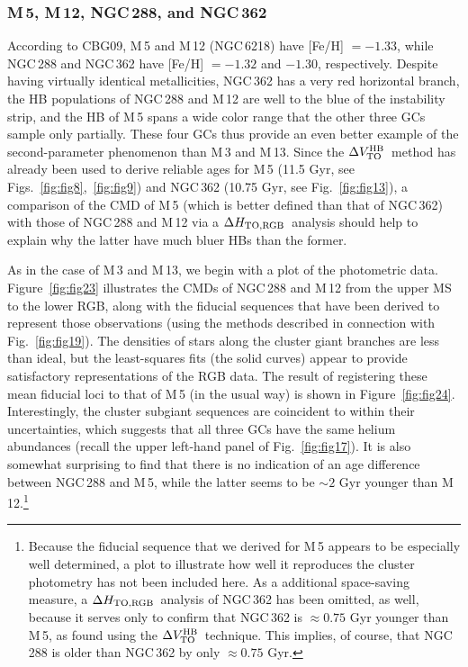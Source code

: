 \documentclass[12pt,preprint]{aastex}
\newcommand\delv{\Delta V^{\rm HB}_{\rm TO}}
\newcommand\delc{\Delta H_{\rm TO,RGB}}
\begin{document}
\subsubsection{M$\,$5, M$\,$12, NGC$\,$288, and NGC$\,$362}
\label{subsec:n288n362}

According to CBG09, M$\,$5 and M$\,$12 (NGC$\,$6218) have [Fe/H] $= -1.33$,
while NGC$\,$288 and NGC$\,$362 have [Fe/H] $= -1.32$ and $-1.30$, respectively.
Despite having virtually identical metallicities, NGC$\,$362 has a very red
horizontal branch, the HB populations of NGC$\,$288 and M$\,$12 are well
to the blue of the instability strip, and the HB of M$\,$5 spans a wide color
range that the other three GCs sample only partially.  These four GCs thus
provide an even better example of the second-parameter phenomenon than M$\,$3
and M$\,$13.  Since the $\delv$\ method has already been used to derive reliable
ages for M$\,$5 (11.5 Gyr, see Figs.~\ref{fig:fig8},~\ref{fig:fig9}) and
NGC$\,$362 (10.75 Gyr, see Fig.~\ref{fig:fig13}), a comparison of the CMD of
M$\,$5 (which is better defined than that of NGC$\,$362) with those of
NGC$\,$288 and M$\,$12 via a $\delc$\ analysis should help to explain why
the latter have much bluer HBs than the former.

As in the case of M$\,$3 and M$\,$13, we begin with a plot of the photometric
data.  Figure~\ref{fig:fig23} illustrates the CMDs of NGC$\,$288 and M$\,$12
from the upper MS to the lower RGB, along with the fiducial sequences that have
been derived to represent those observations (using the methods described in
connection with Fig.~\ref{fig:fig19}).  The densities of stars along the cluster
giant branches are less than ideal, but the least-squares fits (the solid
curves) appear to provide satisfactory representations of the RGB data.  The
result of registering these mean fiducial loci to that of M$\,$5 (in the usual
way) is shown in Figure~\ref{fig:fig24}.  Interestingly, the cluster subgiant
sequences are coincident to within their uncertainties, which suggests that all
three GCs have the same helium abundances (recall the upper left-hand panel of
Fig.~\ref{fig:fig17}).  It is also somewhat surprising to find that there is
no indication of an age difference between NGC$\,$288 and M$\,$5, while the 
latter seems to be $\sim 2$ Gyr younger than M$\,$12.\footnote{Because the
fiducial sequence that we derived for M$\,$5 appears to be especially well
determined, a plot to illustrate how well it reproduces the cluster photometry
has not been included here.  As a additional space-saving measure, a
$\delc$\ analysis of NGC$\,$362 has been omitted, as well, because it serves
only to confirm that NGC$\,$362 is $\approx 0.75$ Gyr younger than M$\,$5, as
found using the $\delv$\ technique.  This implies, of course, that NGC$\,$288
is older than NGC$\,$362 by only $\approx 0.75$ Gyr.}
\end{document}
